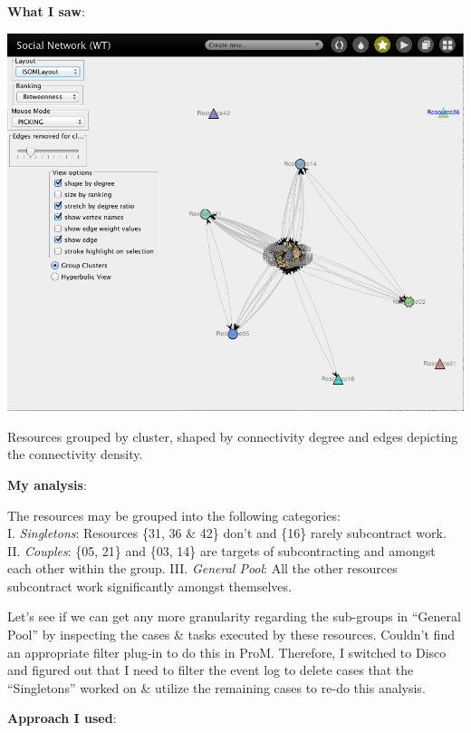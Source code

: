 \documentclass[]{article}
\begin{document}
\textbf{What I saw}:

\includegraphics{CoSeLoG_Step_07_SocialNet.png}

Resources grouped by cluster, shaped by connectivity degree and edges
depicting the connectivity density.

\textbf{My analysis}:

The resources may be grouped into the following categories:\\I.
\emph{Singletons}: Resources \{31, 36 \& 42\} don't and \{16\} rarely
subcontract work.\\II. \emph{Couples}: \{05, 21\} and \{03, 14\} are
targets of subcontracting and amongst each other within the group. III.
\emph{General Pool}: All the other resources subcontract work
significantly amongst themselves.

Let's see if we can get any more granularity regarding the sub-groups in
``General Pool'' by inspecting the cases \& tasks executed by these
resources. Couldn't find an appropriate filter plug-in to do this in
ProM. Therefore, I switched to Disco and figured out that I need to
filter the event log to delete cases that the ``Singletons'' worked on
\& utilize the remaining cases to re-do this analysis.

\textbf{Approach I used}:
\end{document}
